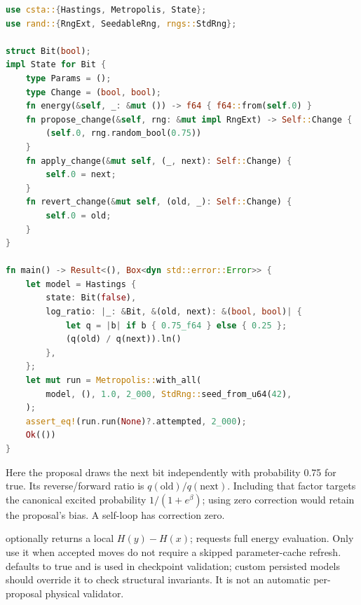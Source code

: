 \documentclass[11pt,a4paper,oneside]{report}
\newcommand{\api}[1]{\texttt{\detokenize{#1}}}
\begin{document}
\par\noindent\begin{minipage}{\linewidth}
\begin{lstlisting}[language=Rust,caption={Correcting an asymmetric independence proposal.}]
use csta::{Hastings, Metropolis, State};
use rand::{RngExt, SeedableRng, rngs::StdRng};

struct Bit(bool);
impl State for Bit {
    type Params = ();
    type Change = (bool, bool);
    fn energy(&self, _: &mut ()) -> f64 { f64::from(self.0) }
    fn propose_change(&self, rng: &mut impl RngExt) -> Self::Change {
        (self.0, rng.random_bool(0.75))
    }
    fn apply_change(&mut self, (_, next): Self::Change) {
        self.0 = next;
    }
    fn revert_change(&mut self, (old, _): Self::Change) {
        self.0 = old;
    }
}

fn main() -> Result<(), Box<dyn std::error::Error>> {
    let model = Hastings {
        state: Bit(false),
        log_ratio: |_: &Bit, &(old, next): &(bool, bool)| {
            let q = |b| if b { 0.75_f64 } else { 0.25 };
            (q(old) / q(next)).ln()
        },
    };
    let mut run = Metropolis::with_all(
        model, (), 1.0, 2_000, StdRng::seed_from_u64(42),
    );
    assert_eq!(run.run(None)?.attempted, 2_000);
    Ok(())
}
\end{lstlisting}
\end{minipage}\par

Here the proposal draws the next bit independently with probability 0.75 for
true. Its reverse/forward ratio is $q(\text{old})/q(\text{next})$. Including that
factor targets the canonical excited probability $1/(1+e^\beta)$; using zero
correction would retain the proposal's bias. A self-loop has correction zero.

\api{delta_energy} optionally returns a local $H(y)-H(x)$; \api{None} requests
full energy evaluation. Only use it when accepted moves do not require a skipped
parameter-cache refresh. \api{valid_state} defaults to true and is used in
checkpoint validation; custom persisted models should override it to check
structural invariants. It is not an automatic per-proposal physical validator.
\end{document}
